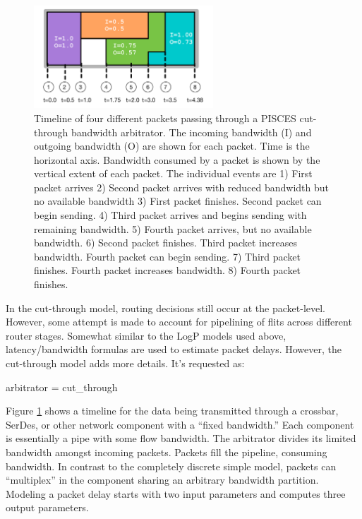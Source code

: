 \begin{figure}
\centering
\includegraphics[width=0.6\textwidth]{figures/pisces}
\caption{Timeline of four different packets passing through a PISCES cut-through bandwidth arbitrator. The incoming bandwidth (I) and outgoing bandwidth (O) are shown for each packet.  Time is the horizontal axis. Bandwidth consumed by a packet is shown by the vertical extent of each packet. The individual events are 1) First packet arrives 2) Second packet arrives with reduced bandwidth but no available bandwidth 3) First packet finishes. Second packet can begin sending. 4) Third packet arrives and begins sending with remaining bandwidth. 5) Fourth packet arrives, but no available bandwidth. 6) Second packet finishes. Third packet increases bandwidth. Fourth packet can begin sending. 7) Third packet finishes. Fourth packet increases bandwidth. 8) Fourth packet finishes.}
\label{fig:pisces}
\end{figure}

In the cut-through model, routing decisions still occur at the packet-level.
However, some attempt is made to account for pipelining of flits across different router stages.
Somewhat similar to the LogP models used above, latency/bandwidth formulas are used to estimate packet delays.
However, the cut-through model adds more details.
It's requested as:

\begin{ViFile}
arbitrator = cut_through
\end{ViFile}
Figure \ref{fig:pisces} shows a timeline for the data being transmitted through a crossbar, SerDes, or other network component with a ``fixed bandwidth.'' 
Each component is essentially a pipe with some flow bandwidth.
The arbitrator divides its limited bandwidth amongst incoming packets.
Packets fill the pipeline, consuming bandwidth.
In contrast to the completely discrete simple model, packets can ``multiplex'' in the component sharing an arbitrary bandwidth partition.
Modeling a packet delay starts with two input parameters and computes three output parameters.

